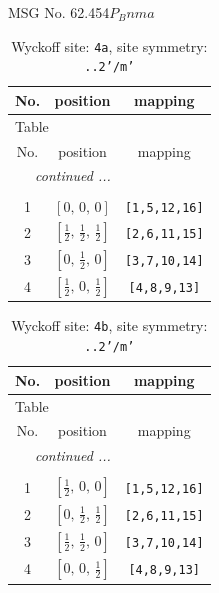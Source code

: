 \documentclass[fleqn,8pt]{jsarticle}
\begin{document}
\setcounter{MaxMatrixCols}{32}

\renewcommand{\tablename}{Table~}
\renewcommand{\figurename}{Figure~}
\begin{center}
\LARGE
MSG No. 62.454\quad$P_{B}nma$
\end{center}
\renewcommand{\arraystretch}{1.2}
\begin{longtable}{ccc}
\caption{Wyckoff site: {\tt 4a}, site symmetry: {\tt ..2'/m'}}
 \\
 \hline \hline
No. & position & mapping \\ \hline \endfirsthead

\multicolumn{2}{l}{\tablename\ \thetable{}} \\
 \hline \hline
No. & position & mapping \\ \hline \endhead

 \hline \hline
\multicolumn{2}{r}{\footnotesize\it continued ...} \\ \endfoot

 \hline \hline
\multicolumn{2}{r}{} \\ \endlastfoot

1 & $\left[ 0,\, 0,\, 0 \right]$ & {\tt [1,5,12,16]} \\ \hline
2 & $\left[ \frac{1}{2},\, \frac{1}{2},\, \frac{1}{2} \right]$ & {\tt [2,6,11,15]} \\ \hline
3 & $\left[ 0,\, \frac{1}{2},\, 0 \right]$ & {\tt [3,7,10,14]} \\ \hline
4 & $\left[ \frac{1}{2},\, 0,\, \frac{1}{2} \right]$ & {\tt [4,8,9,13]} \\
\end{longtable}
\renewcommand{\arraystretch}{1.2}
\begin{longtable}{ccc}
\caption{Wyckoff site: {\tt 4b}, site symmetry: {\tt ..2'/m'}}
 \\
 \hline \hline
No. & position & mapping \\ \hline \endfirsthead

\multicolumn{2}{l}{\tablename\ \thetable{}} \\
 \hline \hline
No. & position & mapping \\ \hline \endhead

 \hline \hline
\multicolumn{2}{r}{\footnotesize\it continued ...} \\ \endfoot

 \hline \hline
\multicolumn{2}{r}{} \\ \endlastfoot

1 & $\left[ \frac{1}{2},\, 0,\, 0 \right]$ & {\tt [1,5,12,16]} \\ \hline
2 & $\left[ 0,\, \frac{1}{2},\, \frac{1}{2} \right]$ & {\tt [2,6,11,15]} \\ \hline
3 & $\left[ \frac{1}{2},\, \frac{1}{2},\, 0 \right]$ & {\tt [3,7,10,14]} \\ \hline
4 & $\left[ 0,\, 0,\, \frac{1}{2} \right]$ & {\tt [4,8,9,13]} \\
\end{longtable}
\end{document}
